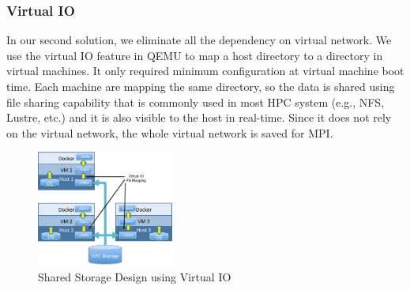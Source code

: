 \subsubsection{Virtual IO}
In our second solution, we eliminate all the dependency on virtual network. We use the virtual IO \cite{russell2008virtio} feature in QEMU to map a host directory to a directory in virtual machines. It only required minimum configuration at virtual machine boot time. Each machine are mapping the same directory, so the data is shared using file sharing capability that is commonly used in most HPC system (e.g., NFS, Lustre, etc.) and it is also visible to the host in real-time. Since it does not rely on the virtual network, the whole virtual network is saved for MPI.
\begin{figure}[h]
    \centering
    \caption{Shared Storage Design using Virtual IO}
    \label{fs3}
    \includegraphics[width=0.4\textwidth]{figures/fs3.pdf}
\end{figure}

